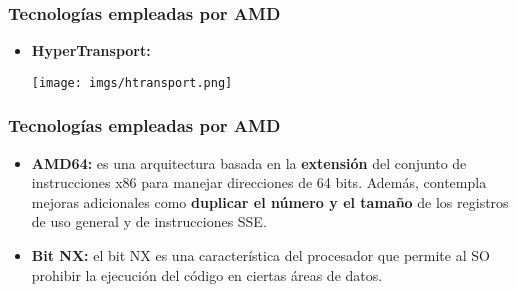 \frame
{
\frametitle{Tecnologías empleadas por AMD}
\begin{itemize}
 \item \textbf{HyperTransport:}

	\begin{center}
	\texttt{[image: imgs/htransport.png]}
	\end{center}

\end{itemize}
}

\frame
{
\frametitle{Tecnologías empleadas por AMD}
\begin{itemize}
 \item \textbf{AMD64:} es una arquitectura basada en la \textbf{extensión} del conjunto de instrucciones x86 para manejar direcciones de 64 bits. Además, contempla mejoras adicionales como \textbf{duplicar el número y el tamaño} de los registros de uso general y de instrucciones SSE.

 \item \textbf{Bit NX:} el bit NX es una característica del procesador que permite al SO prohibir la ejecución del código en ciertas áreas de datos. 
\end{itemize}
}
